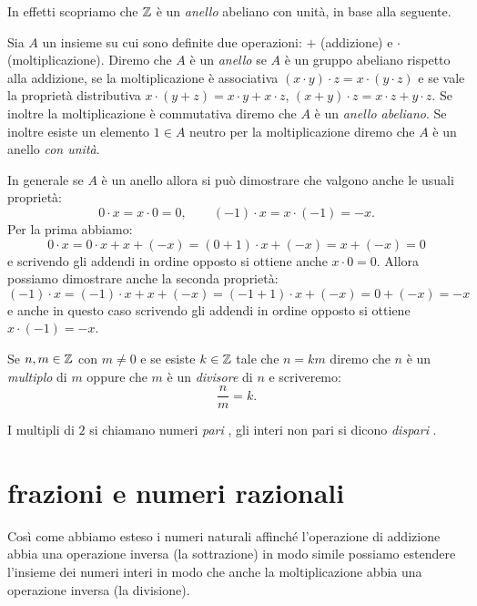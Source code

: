 In effetti scopriamo che ${\mathbb Z}$ è un \emph{anello}%
%
 abeliano con unità, in base alla seguente.
%
\begin{definition}[anello]
  \label{def:anello}%
  Sia $A$ un insieme su cui sono definite due operazioni: $+$ (addizione) e $\cdot$ (moltiplicazione).  
  Diremo che $A$ è un \emph{anello} se $A$ è un gruppo abeliano rispetto alla 
  addizione, 
  se la moltiplicazione è associativa $(x\cdot y)\cdot z = x\cdot (y\cdot z)$ 
  e se vale la proprietà distributiva $x\cdot(y+z) = x\cdot y + x\cdot z$,
  $(x+y)\cdot z = x\cdot z + y\cdot z$.
  Se inoltre la moltiplicazione è commutativa diremo che $A$ è un \emph{anello abeliano}.
  Se inoltre esiste un elemento $1\in A$ neutro per la moltiplicazione 
  diremo che $A$ è un anello \emph{con unità}.
\end{definition}

In generale se $A$ è un anello allora si può dimostrare che valgono anche le usuali proprietà:
\[
  0\cdot x = x\cdot 0 = 0, \qquad
  (-1)\cdot x = x \cdot (-1) = -x.
\]
Per la prima abbiamo: 
\[
  0\cdot x = 0\cdot x + x + (-x) = (0+1)\cdot x + (-x) = x + (-x) = 0
\]
e scrivendo gli addendi in ordine opposto si ottiene anche $x\cdot 0 = 0$.
Allora possiamo dimostrare anche la seconda proprietà:
\[
   (-1)\cdot x = (-1)\cdot x + x + (-x) = (-1 + 1)\cdot x + (-x) = 0 + (-x) = -x
\]
e anche in questo caso scrivendo gli addendi in ordine opposto si ottiene $x\cdot(-1)=-x$.

Se $n,m\in{\mathbb Z}$ con $m\neq 0$ e 
%
se esiste $k\in{\mathbb Z}$ tale 
che $n=km$ diremo che $n$ è un \emph{multiplo}
di $m$ oppure che $m$ è un \emph{divisore}%
%
 di $n$
e scriveremo:
\[
  \frac{n}{m} = k.  
\]

I multipli di $2$ si chiamano numeri \emph{pari}%
%
,
gli interi non pari si dicono \emph{dispari}%
%
. 


\section{frazioni e numeri razionali}

Così come abbiamo esteso i numeri naturali affinché l'operazione di addizione abbia 
una operazione inversa (la sottrazione) in modo simile possiamo estendere l'insieme 
dei numeri interi in modo che anche la moltiplicazione abbia una operazione inversa 
(la divisione).

